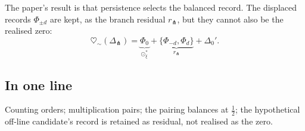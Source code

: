 \documentclass[11pt]{article}
\newcommand{\heartsim}{\heartsuit_{\sim}}
\newcommand{\DeltaFork}{\Delta_{\pitchfork}}
\begin{document}
The paper's result is that persistence selects the balanced record. The displaced records \(\Phi_{\pm d}\) are kept, as the branch residual \(r_{\pitchfork}\), but they cannot also be the realised zero:
\[
\heartsim(\DeltaFork)
=
\underbrace{\Phi_0}_{\odot_\xi^\ast}
+
\underbrace{\{\Phi_{-d},\Phi_d\}}_{r_{\pitchfork}}
+
\Delta_0'.
\]

\subsection*{In one line}

Counting orders; multiplication pairs; the pairing balances at \(\tfrac12\); the hypothetical off-line candidate's record is retained as residual, not realised as the zero.
\end{document}
